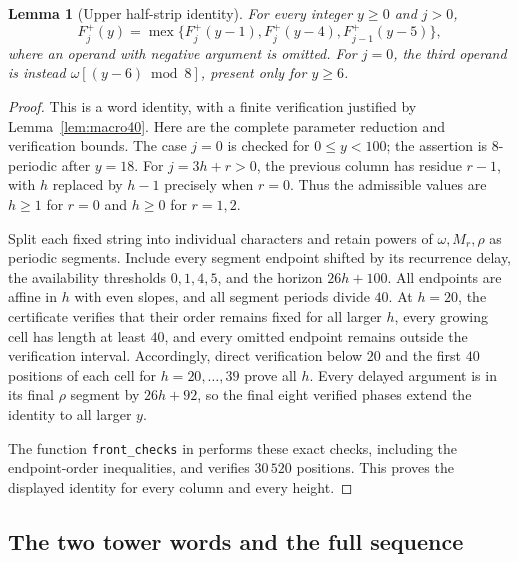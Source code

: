 \documentclass[11pt]{article}
\newtheorem{lemma}[theorem]{Lemma}
\theoremstyle{remark}\newtheorem{remark}[theorem]{Remark}
\DeclareMathOperator{\mex}{mex}
\begin{document}
\begin{lemma}[Upper half-strip identity]\label{lem:upper-front}
For every integer $y\ge0$ and $j>0$,
\begin{equation}\label{eq:upper-front-mex}
 F_j^+(y)=\mex\{F_j^+(y-1),F_j^+(y-4),F_{j-1}^+(y-5)\},
\end{equation}
where an operand with negative argument is omitted.  For $j=0$, the
third operand is instead $\omega[(y-6)\bmod8]$, present only for $y\ge6$.
\end{lemma}
\begin{proof}
This is a word identity, with a finite verification justified by
Lemma~\ref{lem:macro40}.  Here are the complete parameter reduction and
verification bounds.  The case $j=0$ is checked for $0\le y<100$;
the assertion is $8$-periodic after $y=18$.  For $j=3h+r>0$, the previous
column has residue $r-1$, with $h$ replaced by $h-1$ precisely when
$r=0$.  Thus the admissible values are $h\ge1$ for $r=0$ and $h\ge0$
for $r=1,2$.

Split each fixed string into individual characters and retain powers
of $\omega,M_r,\rho$ as periodic segments.  Include every segment
endpoint shifted by its recurrence delay, the availability thresholds
$0,1,4,5$, and the horizon $26h+100$.  All endpoints are affine in $h$
with even slopes, and all segment periods divide $40$.  At $h=20$,
the certificate verifies that their order remains fixed for all larger
$h$, every growing cell has length at least $40$, and every omitted
endpoint remains outside the verification interval.  Accordingly,
direct verification below $20$ and the first $40$ positions of each
cell for $h=20,\ldots,39$ prove all $h$.  Every delayed argument is in
its final $\rho$ segment by $26h+92$, so the final eight verified phases
extend the identity to all larger $y$.

The function \texttt{front\_checks} in
 performs these exact checks,
including the endpoint-order inequalities, and verifies $30\,520$
positions.  This proves the displayed identity for every column and
every height.
\end{proof}

\subsection{The two tower words and the full sequence}
\end{document}
